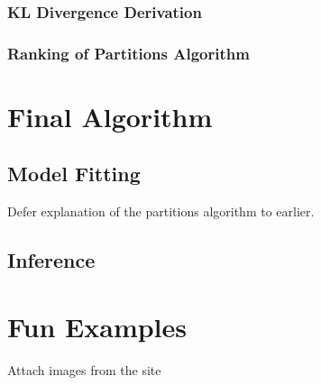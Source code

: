 \documentclass{article}
\begin{document}
\subsubsection{KL Divergence Derivation}
\subsubsection{Ranking of Partitions Algorithm}

\section{Final Algorithm}
\subsection{Model Fitting}
Defer explanation of the partitions algorithm to earlier.
\subsection{Inference}

\section{Fun Examples}
Attach images from the site
\end{document}
